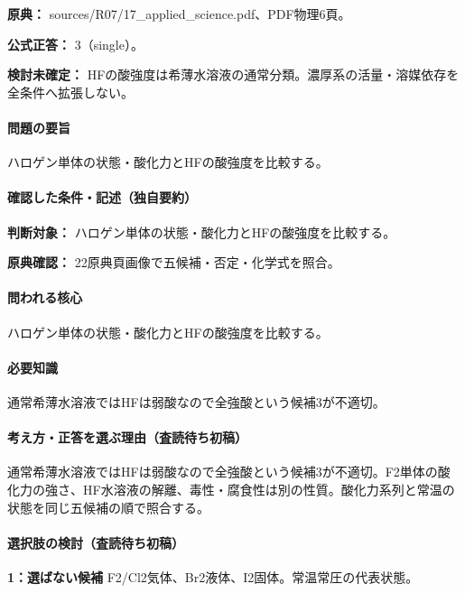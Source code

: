 \noindent\textbf{原典：} sources/R07/17\_applied\_science.pdf、PDF物理6頁。

\textbf{公式正答：} 3（single）。

\par\textbf{検討未確定：} HFの酸強度は希薄水溶液の通常分類。濃厚系の活量・溶媒依存を全条件へ拡張しない。

\paragraph{問題の要旨} ハロゲン単体の状態・酸化力とHFの酸強度を比較する。

\paragraph{確認した条件・記述（独自要約）}\mbox{}\par

\noindent\textbf{判断対象：} ハロゲン単体の状態・酸化力とHFの酸強度を比較する。\par

\noindent\textbf{原典確認：} 22原典頁画像で五候補・否定・化学式を照合。\par

\paragraph{問われる核心} ハロゲン単体の状態・酸化力とHFの酸強度を比較する。

\paragraph{必要知識} 通常希薄水溶液ではHFは弱酸なので全強酸という候補3が不適切。

\paragraph{考え方・正答を選ぶ理由（査読待ち初稿）} 通常希薄水溶液ではHFは弱酸なので全強酸という候補3が不適切。F2単体の酸化力の強さ、HF水溶液の解離、毒性・腐食性は別の性質。酸化力系列と常温の状態を同じ五候補の順で照合する。

\paragraph{選択肢の検討（査読待ち初稿）}\mbox{}\par

\noindent\textbf{1：選ばない候補} F2/Cl2気体、Br2液体、I2固体。常温常圧の代表状態。\par


